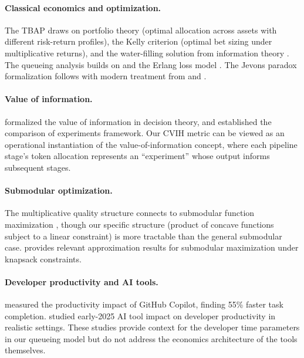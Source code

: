 \documentclass[11pt, a4paper, logo, copyright]{googledeepmind}
\begin{document}
\paragraph{Classical economics and optimization.}
The TBAP draws on portfolio theory \citep{markowitz1952} (optimal allocation across assets with different risk-return profiles), the Kelly criterion \citep{kelly1956} (optimal bet sizing under multiplicative returns), and the water-filling solution from information theory \citep{cover2006}. The queueing analysis builds on \citet{kleinrock1975, kleinrock1976} and the Erlang loss model \citep{erlang1917}. The Jevons paradox formalization follows \citet{jevons1865} with modern treatment from \citet{sorrell2009} and \citet{alcott2005}.

\paragraph{Value of information.}
\citet{howard1966} formalized the value of information in decision theory, and \citet{blackwell1953} established the comparison of experiments framework. Our CVIH metric can be viewed as an operational instantiation of the value-of-information concept, where each pipeline stage's token allocation represents an ``experiment'' whose output informs subsequent stages.

\paragraph{Submodular optimization.}
The multiplicative quality structure connects to submodular function maximization \citep{nemhauser1978, krause2014, buchbinder2015, feige2011}, though our specific structure (product of concave functions subject to a linear constraint) is more tractable than the general submodular case. \citet{sviridenko2004} provides relevant approximation results for submodular maximization under knapsack constraints.

\paragraph{Developer productivity and AI tools.}
\citet{peng2023impact} measured the productivity impact of GitHub Copilot, finding 55\% faster task completion. \citet{metr2025} studied early-2025 AI tool impact on developer productivity in realistic settings. These studies provide context for the developer time parameters in our queueing model but do not address the economics architecture of the tools themselves.
\end{document}
